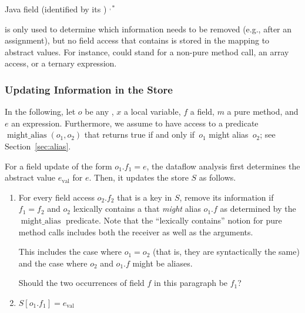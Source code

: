 \begin{bnfgrammar}
        {  \qquad Java field (identified by its )}
        { \qquad {}}
        {  
            \literal{(} $^{,*}$ \literal{)}}
\end{bnfgrammar}

 is only used to determine which
information needs to be removed (e.g., after an assignment), but no field
access that contains  is stored in the mapping to
abstract values.  For instance,  could stand for
a non-pure method call, an array access, or a ternary expression.


\subsubsection{Updating Information in the Store}

\newcommand{\alias}{\operatorname{might\_alias}}

In the following, let $o$ be any , $x$ a local
variable, $f$ a field, $m$ a pure method, and $e$ an expression.
Furthermore, we assume to have access to a predicate $\alias(o_1,o_2)$
that returns true if and only if~$o_1$ might alias~$o_2$; see
Section~\ref{sec:alias}.


For a field update of the form $o_1.f_1 = e$, the
dataflow analysis first determines the abstract value $e_\text{val}$ for $e$.
Then, it updates the store $S$ as follows.
\begin{enumerate}
    \item For every field access $o_2.f_2$ that is a key in $S$, remove its
      information if $f_1 = f_2$ and
      $o_2$ lexically contains a  that \emph{might}
        alias $o_1.f$ as determined by the $\alias$
        predicate.
      Note that the ``lexically contains'' notion for pure method calls
        includes both the receiver as well as the arguments.

      This includes the case where $o_1 = o_2$ (that is, they are
      syntactically the same) and the case where  $o_2$ and $o_1.f$ might be
      aliases.

      \begin{workinprogress}
        Should the two occurrences of field $f$ in this paragraph be $f_1$?
      \end{workinprogress}

    \item $S[o_1.f_1] = e_\text{val}$
\end{enumerate}



